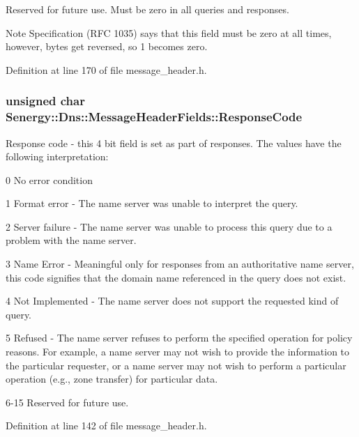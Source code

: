 Reserved for future use. Must be zero in all queries and responses. 

\begin{DoxyNote}{Note}
Specification (R\-F\-C 1035) says that this field must be zero at all times, however, bytes get reversed, so 1 becomes zero. 
\end{DoxyNote}


Definition at line 170 of file message\-\_\-header.\-h.

\hypertarget{struct_senergy_1_1_dns_1_1_message_header_fields_a2f42c94d4e50dd7a63b11c8b374597c4}{
\subsubsection[{Response\-Code}]{\setlength{\rightskip}{0pt plus 5cm}unsigned char Senergy\-::\-Dns\-::\-Message\-Header\-Fields\-::\-Response\-Code}}\label{struct_senergy_1_1_dns_1_1_message_header_fields_a2f42c94d4e50dd7a63b11c8b374597c4}


Response code -\/ this 4 bit field is set as part of responses. The values have the following interpretation\-: 

0 No error condition

1 Format error -\/ The name server was unable to interpret the query.

2 Server failure -\/ The name server was unable to process this query due to a problem with the name server.

3 Name Error -\/ Meaningful only for responses from an authoritative name server, this code signifies that the domain name referenced in the query does not exist.

4 Not Implemented -\/ The name server does not support the requested kind of query.

5 Refused -\/ The name server refuses to perform the specified operation for policy reasons. For example, a name server may not wish to provide the information to the particular requester, or a name server may not wish to perform a particular operation (e.\-g., zone transfer) for particular data.

6-\/15 Reserved for future use. 

Definition at line 142 of file message\-\_\-header.\-h.

